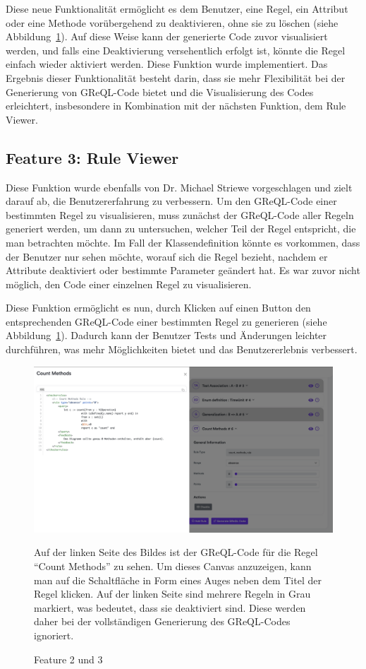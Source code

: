 Diese neue Funktionalität ermöglicht es dem Benutzer, eine Regel, ein Attribut oder eine Methode vorübergehend zu
deaktivieren, ohne sie zu löschen (siehe Abbildung~\ref{fig:feat2n3}). Auf diese Weise kann der generierte Code zuvor visualisiert werden, und falls eine
Deaktivierung versehentlich erfolgt ist, könnte die Regel einfach wieder aktiviert werden. Diese Funktion wurde
implementiert. Das Ergebnis dieser Funktionalität besteht darin, dass sie mehr Flexibilität bei der Generierung von
GReQL-Code bietet und die Visualisierung des Codes erleichtert, insbesondere in Kombination mit der nächsten Funktion,
dem Rule Viewer.

\subsection{Feature 3: Rule Viewer}
Diese Funktion wurde ebenfalls von Dr. Michael Striewe vorgeschlagen und zielt darauf ab, die Benutzererfahrung zu
verbessern. Um den GReQL-Code einer bestimmten Regel zu visualisieren, muss zunächst der GReQL-Code aller Regeln
generiert werden, um dann zu untersuchen, welcher Teil der Regel entspricht, die man betrachten möchte. Im Fall der
Klassendefinition könnte es vorkommen, dass der Benutzer nur sehen möchte, worauf sich die Regel bezieht, nachdem er
Attribute deaktiviert oder bestimmte Parameter geändert hat. Es war zuvor nicht möglich, den Code einer einzelnen Regel
zu visualisieren.

Diese Funktion ermöglicht es nun, durch Klicken auf einen Button den entsprechenden GReQL-Code einer bestimmten Regel
zu generieren (siehe Abbildung~\ref{fig:feat2n3}). Dadurch kann der Benutzer Tests und Änderungen leichter durchführen, was mehr Möglichkeiten bietet und
das Benutzererlebnis verbessert.

\begin{figure}[h]
    \centering
    \includegraphics[width=16cm]{images/features-2n3}
    \caption{Feature 2 und 3}
    \medskip
    \small
    Auf der linken Seite des Bildes ist der GReQL-Code für die Regel ``Count Methods'' zu sehen. Um dieses Canvas
    anzuzeigen, kann man auf die Schaltfläche in Form eines Auges neben dem Titel der Regel klicken. Auf der linken
    Seite sind mehrere Regeln in Grau markiert, was bedeutet, dass sie deaktiviert sind. Diese werden daher bei der
    vollständigen Generierung des GReQL-Codes ignoriert.
    \label{fig:feat2n3}
\end{figure}

